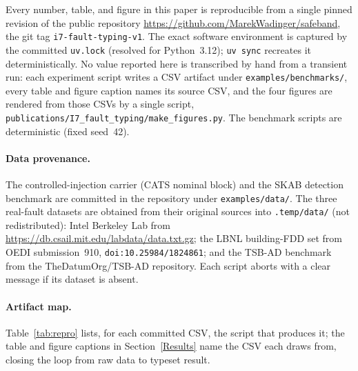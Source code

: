 Every number, table, and figure in this paper is reproducible from a
single pinned revision of the public repository
\url{https://github.com/MarekWadinger/safeband}, the git
tag \texttt{i7-fault-typing-v1}. The exact software environment is
captured by the committed \texttt{uv.lock} (resolved for Python~3.12);
\texttt{uv sync} recreates it deterministically. No value reported here
is transcribed by hand from a transient run: each experiment script
writes a CSV artifact under \texttt{examples/benchmarks/}, every table
and figure caption names its source CSV, and the four figures are
rendered from those CSVs by a single script,
\texttt{publications/I7\_fault\_typing/make\_figures.py}. The
benchmark scripts are deterministic (fixed seed~42).

\paragraph{Data provenance.}
The controlled-injection carrier (CATS nominal block) and the SKAB
detection benchmark are committed in the repository under
\texttt{examples/data/}. The three real-fault datasets are obtained from
their original sources into \texttt{.temp/data/} (not redistributed):
Intel Berkeley Lab from \url{https://db.csail.mit.edu/labdata/data.txt.gz};
the LBNL building-FDD set from OEDI submission~910,
\texttt{doi:10.25984/1824861}; and the TSB-AD benchmark from the
TheDatumOrg/TSB-AD repository. Each script aborts with a clear message
if its dataset is absent.

\paragraph{Artifact map.}
Table~\ref{tab:repro} lists, for each committed CSV, the script that
produces it; the table and figure captions in Section~\ref{Results} name
the CSV each draws from, closing the loop from raw data to typeset
result.

